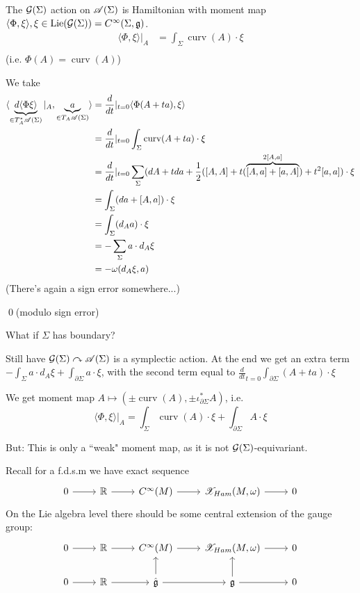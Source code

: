 \documentclass[x11names,reqno,14pt]{extarticle}
\newcommand{\mk}[1]{\mathfrak{#1}}
\newcommand{\g}{\mk{g}}
\newcommand{\dd}[2]{\frac{d#1}{d#2}}
\begin{document}
The $\mathcal{G}(\Sigma)$ action on $\mathscr{A}(\Sigma)$ is Hamiltonian with moment map $\langle\Phi,\xi\rangle, \xi \in \operatorname{Lie}(\mc{G}(\Sigma)) = C^\oo(\Sigma,\g)$. 
\begin{align*}
\langle\Phi,\xi\rangle|_A & = \int_{\Sigma}\operatorname{curv}(A)\cdot\xi \\
\end{align*}
(i.e. $\Phi(A) = \operatorname{curv}(A)$)

\proof

We take 
\begin{align*}
\langle \underbrace{d\langle\Phi\xi\rangle}_{\in T_A^*\ms{A}(\Sigma)}|_A, \underbrace{a}_{\in T_A\ms{A}(\Sigma)}\rangle & = \dd{}{t}|_{t=0}\langle\Phi(A + ta),\xi\rangle \\
& = \dd{}{t}|_{t=0}\int_{\Sigma}\operatorname{curv}(A + ta)\cdot\xi \\
& = \dd{}{t}|_{t=0}\sum_{\Sigma}(dA + tda+ \frac12([A,A] + t(\overbrace{[A,a] + [a,A]}^{2[A,a]}) + t^2[a,a])\cdot\xi\\
& = \int_{\Sigma}(da + [A,a])\cdot\xi \\
& = \int_{\Sigma}(d_Aa)\cdot\xi \\
& = -\sum_{\Sigma}a\cdot d_A\xi \\
& = -\omega(d_A\xi,a) 
\end{align*}
(There's again a sign error somewhere...)

\qed(modulo sign error)


What if $\Sigma$ has boundary?

Still have $\mathcal{G}(\Sigma)\curvearrowright\mathscr{A}(\Sigma)$ is a symplectic action. At the end we get an extra term $-\int_{\Sigma}a\cdot d_A\xi + \int_{\partial\Sigma}a\cdot\xi$, with the second term equal to $\dd{}{t}_{t=0}\int_{\partial\Sigma}(A + ta)\cdot\xi$

We get moment map $A \mapsto (\pm\operatorname{curv}(A), \pm\iota_{\partial\Sigma}^*A)$, i.e. 
\[
\langle\Phi,\xi\rangle|_A = \int_{\Sigma}\operatorname{curv}(A)\cdot\xi + \int_{\partial\Sigma}A\cdot\xi
\]

But: This is only a ``weak" moment map, as it is not $\mathcal{G}(\Sigma)$-equivariant.

Recall for a f.d.s.m we have exact sequence
\[
\exactshort{\R}{}{C^\oo(M)}{}{\ms{X}_{Ham}(M,\omega)}
\]
On the Lie algebra level there should be some central extension of the gauge group:
\[
\begin{tikzcd}
0 \ar[r] &\R\ar[r] & C^\oo(M) \ar[r] & \ms{X}_{Ham}(M,\omega) \ar[r] & 0 \\
0 \ar[r] & \R \ar[r] & \hat{\g} \ar[u] \ar[r] & \g \ar[r]\ar[u] & 0
\end{tikzcd}
\]
\end{document}
